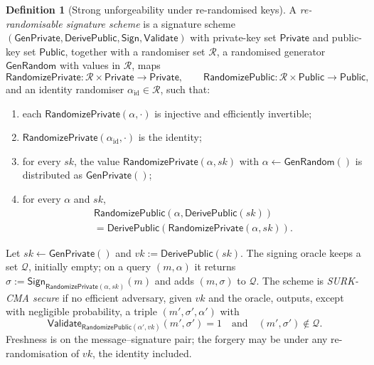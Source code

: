 \documentclass[11pt,a4paper]{article}
\theoremstyle{definition}
\newtheorem{definition}[theorem]{Definition}
\begin{document}
\begin{definition}[Strong unforgeability under re-randomised keys]
\label{def:surk}
A \emph{re-randomisable signature scheme} is a signature scheme
\((\mathsf{GenPrivate}, \mathsf{DerivePublic}, \mathsf{Sign},
\mathsf{Validate})\) with private-key set \(\mathsf{Private}\) and
public-key set \(\mathsf{Public}\), together with a randomiser set
\(\mathcal{R}\), a randomised generator \(\mathsf{GenRandom}\) with values
in \(\mathcal{R}\), maps
\[
  \mathsf{RandomizePrivate} \colon \mathcal{R} \times \mathsf{Private}
    \to \mathsf{Private} , \qquad
  \mathsf{RandomizePublic} \colon \mathcal{R} \times \mathsf{Public}
    \to \mathsf{Public} ,
\]
and an identity randomiser \(\alpha_{\mathrm{id}} \in \mathcal{R}\), such
that:
\begin{enumerate}
\item each \(\mathsf{RandomizePrivate}(\alpha, \cdot)\) is injective and
  efficiently invertible;
\item \(\mathsf{RandomizePrivate}(\alpha_{\mathrm{id}}, \cdot)\) is the
  identity;
\item for every \(\mathit{sk}\), the value
  \(\mathsf{RandomizePrivate}(\alpha, \mathit{sk})\) with
  \(\alpha \gets \mathsf{GenRandom}()\) is distributed as
  \(\mathsf{GenPrivate}()\);
\item for every \(\alpha\) and \(\mathit{sk}\),
  \begin{multline*}
    \mathsf{RandomizePublic}(\alpha, \mathsf{DerivePublic}(\mathit{sk})) \\
    = \mathsf{DerivePublic}(\mathsf{RandomizePrivate}(\alpha, \mathit{sk})) .
  \end{multline*}
\end{enumerate}
Let \(\mathit{sk} \gets \mathsf{GenPrivate}()\) and
\(\mathit{vk} := \mathsf{DerivePublic}(\mathit{sk})\). The signing oracle
keeps a set \(\mathcal{Q}\), initially empty; on a query
\((m, \alpha)\) it returns
\(\sigma := \mathsf{Sign}_{\mathsf{RandomizePrivate}(\alpha,
\mathit{sk})}(m)\) and adds \((m, \sigma)\) to \(\mathcal{Q}\). The scheme
is \emph{SURK-CMA secure} if no efficient adversary, given \(\mathit{vk}\)
and the oracle, outputs, except with negligible probability, a triple
\((m', \sigma', \alpha')\) with
\[
  \mathsf{Validate}_{\mathsf{RandomizePublic}(\alpha', \mathit{vk})}
    (m', \sigma') = 1
  \quad\text{and}\quad (m', \sigma') \notin \mathcal{Q} .
\]
Freshness is on the message--signature pair; the forgery may be under any
re-randomisation of \(\mathit{vk}\), the identity included.
\end{definition}
\end{document}
